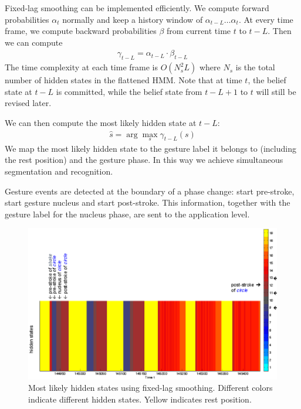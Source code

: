 \documentclass[conference]{IEEEtran}
\begin{document}
Fixed-lag smoothing can be implemented efficiently. We compute forward
probabilities $\alpha_t$ normally and keep a history window of $\alpha_{t -
L}\ldots\alpha_t$. At every time frame, we compute backward probabilities
$\beta$ from current time $t$ to $t - L$. Then we can compute
\begin{align}
\gamma_{t - L} = \alpha_{t - L} \cdot \beta_{t - L}
\end{align}  
The time complexity at each time frame is $O(N_s^2L)$ where $N_s$ is the total
number of hidden states in the flattened HMM. Note that at time $t$, the belief
state at $t - L$ is committed, while the belief state from $t - L + 1$ to $t$ will still be revised later.

We can then compute the most likely hidden state at $t - L$:
\begin{align}
\hat{s} = \arg\max_s \gamma_{t - L}(s)
\end{align}
We map the most likely hidden state to the gesture label it
belongs to (including the rest position) and the gesture phase. In this way
we achieve simultaneous segmentation and recognition.

Gesture events are detected at the boundary of a phase change: start pre-stroke,
start gesture nucleus and start post-stroke. This information, together with the
gesture label for the nucleus phase, are sent to the application level.

\begin{figure}[t]
\centering
\includegraphics[width=1.1\columnwidth]{fig/circle_shake_label.ps} \caption{Most
likely hidden states using fixed-lag smoothing. Different colors indicate different hidden states. Yellow indicates rest position.}
\label{fig:visual_hidden}
\end{figure}
\end{document}
